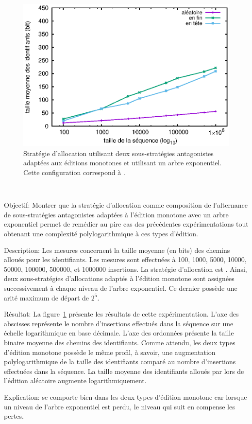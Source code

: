 \begin{figure}
  \centering
  \includegraphics[width=.8\textwidth]{./img/lseq/lseq.eps}
  \caption{\label{fig:lseq:lseq}Stratégie d'allocation utilisant deux
    sous-stratégies antagonistes adaptées aux éditions monotones et utilisant un
    arbre exponentiel. Cette configuration correspond à \LSEQ.}
\end{figure}

\ \\

\begin{asparadesc}
\item [Objectif:] Montrer que la stratégie d'allocation \LSEQ comme composition
  de l'alternance de sous-stratégies antagonistes adaptées à l'édition monotone
  avec un arbre exponentiel permet de remédier au pire cas des précédentes
  expérimentations tout obtenant une complexité polylogarithmique à ces types
  d'édition.
\item [Description:] Les mesures concernent la taille moyenne (en bits) des
  chemins alloués pour les identifiants. Les mesures sont effectuées à 100,
  1000, 5000, 10000, 50000, 100000, 500000, et 1000000 insertions. La stratégie
  d'allocation est \LSEQ. Ainsi, deux sous-stratégies d'allocations adaptés à
  l'édition monotone sont assignées successivement à chaque niveau de l'arbre
  exponentiel. Ce dernier possède une arité maximum de départ de $2^5$.
\item [Résultat:] La figure~\ref{fig:lseq:lseq} présente les résultats de cette
  expérimentation. L'axe des abscisses représente le nombre d'insertions
  effectués dans la séquence sur une échelle logarithmique en base
  décimale. L'axe des ordonnées présente la taille binaire moyenne des chemins
  des identifiants. Comme attendu, les deux types d'édition monotone possède le
  même profil, à savoir, une augmentation polylogarithmique de la taille des
  identifiants comparé au nombre d'insertions effectuées dans la séquence. La
  taille moyenne des identifiants alloués par \LSEQ lors de l'édition aléatoire
  augmente logarithmiquement.
\item [Explication:] \LSEQ se comporte bien dans les deux types d'édition
  monotone car lorsque un niveau de l'arbre exponentiel est perdu, le niveau
  qui suit en compense les pertes.
\end{asparadesc}

